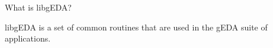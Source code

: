  What is libgEDA? 

  libgEDA is a set of common routines that are used in the gEDA suite of applications. 

